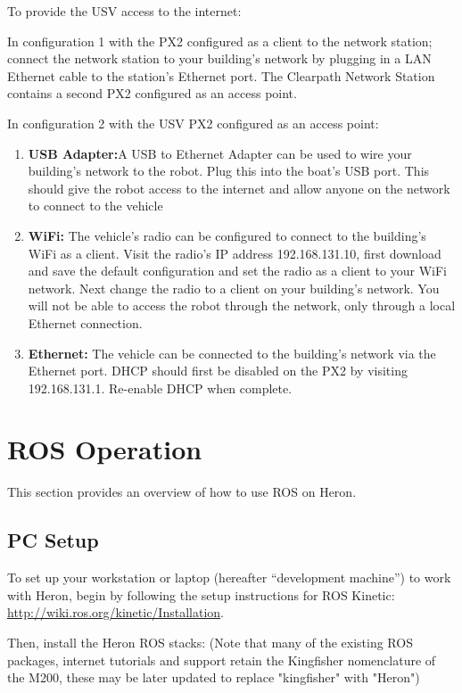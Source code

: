 \documentclass[]{clearpath-latex/clearpath-manual}
\begin{document}
To provide the USV access to the internet:

In configuration 1 with the PX2 configured as a client to the network station; connect the network station to your building's network by plugging in a LAN Ethernet cable to the station's Ethernet port. The Clearpath Network Station contains a second PX2 configured as an access point.

In configuration 2 with the USV PX2 configured as an access point:

\begin{enumerate}
\item \textbf{USB Adapter:}A USB to Ethernet Adapter can be used to wire your building's network to the robot. Plug this into the boat's USB port. This should give the robot access to the internet and allow anyone on the network to connect to the vehicle
\item \textbf{WiFi:} The vehicle's radio can be configured to connect to the building's WiFi as a client. Visit the radio's IP address 192.168.131.10, first download and save the default configuration and set the radio as a client to your WiFi network. Next change the radio to a client on your building's network. You will not be able to access the robot through the network, only through a local Ethernet connection.
\item \textbf{Ethernet:} The vehicle can be connected to the building's network via the Ethernet port. DHCP should first be disabled on the PX2 by visiting 192.168.131.1. Re-enable DHCP when complete.
\end{enumerate}



\newpage

\section{ROS Operation}
This section provides an overview of how to use ROS on Heron.

\subsection{PC Setup} \label{pcsetup}

To set up your workstation or laptop (hereafter “development machine”) to work with Heron, begin by following the setup instructions for ROS Kinetic: \url{http://wiki.ros.org/kinetic/Installation}.

Then, install the Heron ROS stacks:
(Note that many of the existing ROS packages, internet tutorials and support retain the Kingfisher nomenclature of the M200, these may be later updated to replace "kingfisher" with "Heron")
\end{document}
